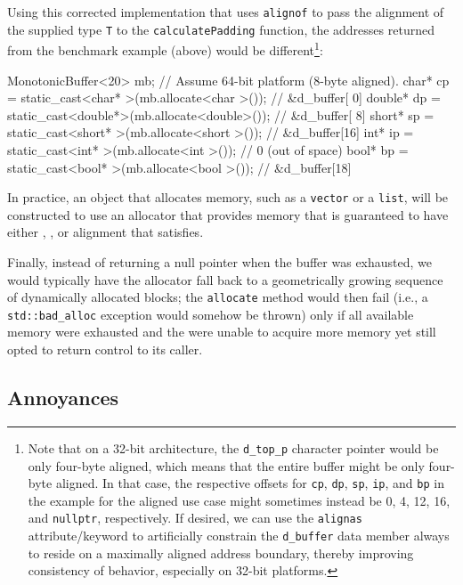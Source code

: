\noindent Using this corrected implementation that uses \lstinline!alignof! to pass
the alignment of the supplied type \lstinline!T! to the
\lstinline!calculatePadding! function, the addresses returned from the
benchmark example (above) would be different{\cprotect\footnote{Note
that on a 32-bit architecture, the \lstinline!d_top_p! character
pointer would be only four-byte aligned, which means that the entire
buffer might be only four-byte aligned. In that case, the respective
offsets for \lstinline!cp!, \lstinline!dp!, \lstinline!sp!, \lstinline!ip!, and
\lstinline!bp! in the example for the aligned use case might sometimes
instead be 0, 4, 12, 16, and \lstinline!nullptr!, respectively. If
  desired, we can use the \lstinline!alignas!
  attribute/keyword to artificially constrain the \lstinline!d_buffer!
  data member always to reside on a maximally aligned address boundary,
  thereby improving consistency of behavior, especially on 32-bit
  platforms.}}:

\begin{emcppslisting}
MonotonicBuffer<20> mb;  // Assume 64-bit platform (8-byte aligned).
char*   cp = static_cast<char*  >(mb.allocate<char  >());  // &d_buffer[ 0]
double* dp = static_cast<double*>(mb.allocate<double>());  // &d_buffer[ 8]
short*  sp = static_cast<short* >(mb.allocate<short >());  // &d_buffer[16]
int*    ip = static_cast<int*   >(mb.allocate<int   >());  // 0 (out of space)
bool*   bp = static_cast<bool*  >(mb.allocate<bool  >());  // &d_buffer[18]
\end{emcppslisting}

\noindent In practice, an object that allocates memory, such as a \lstinline!vector!
or a \lstinline!list!, will be constructed to use an allocator that provides memory that is guaranteed to have either , , or alignment that satisfies.

Finally, instead of returning a null pointer when the buffer was
exhausted, we would typically have the allocator fall back to a
geometrically growing sequence of dynamically allocated blocks; the
\lstinline!allocate! method would then fail (i.e., a
\lstinline!std::bad_alloc! exception would somehow be thrown) only if all
available memory were exhausted and the 
were unable to acquire more memory yet still opted to return control
to its caller.

\subsection[Annoyances]{Annoyances}\label{annoyances-alignof}

